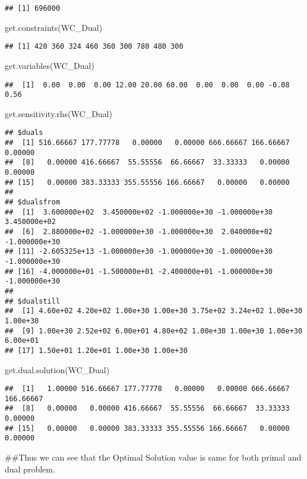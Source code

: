 \documentclass[
]{article}
\newenvironment{Shaded}{\begin{snugshade}}{\end{snugshade}}
\newcommand{\FunctionTok}[1]{\textcolor[rgb]{0.00,0.00,0.00}{#1}}
\newcommand{\NormalTok}[1]{#1}
\begin{document}
\begin{verbatim}
## [1] 696000
\end{verbatim}

\begin{Shaded}
\begin{Highlighting}[]
\FunctionTok{get.constraints}\NormalTok{(WC\_Dual)}
\end{Highlighting}
\end{Shaded}

\begin{verbatim}
## [1] 420 360 324 460 360 300 780 480 300
\end{verbatim}

\begin{Shaded}
\begin{Highlighting}[]
\FunctionTok{get.variables}\NormalTok{(WC\_Dual)}
\end{Highlighting}
\end{Shaded}

\begin{verbatim}
##  [1]  0.00  0.00  0.00 12.00 20.00 60.00  0.00  0.00  0.00 -0.08  0.56
\end{verbatim}

\begin{Shaded}
\begin{Highlighting}[]
\FunctionTok{get.sensitivity.rhs}\NormalTok{(WC\_Dual)}
\end{Highlighting}
\end{Shaded}

\begin{verbatim}
## $duals
##  [1] 516.66667 177.77778   0.00000   0.00000 666.66667 166.66667   0.00000
##  [8]   0.00000 416.66667  55.55556  66.66667  33.33333   0.00000   0.00000
## [15]   0.00000 383.33333 355.55556 166.66667   0.00000   0.00000
## 
## $dualsfrom
##  [1]  3.600000e+02  3.450000e+02 -1.000000e+30 -1.000000e+30  3.450000e+02
##  [6]  2.880000e+02 -1.000000e+30 -1.000000e+30  2.040000e+02 -1.000000e+30
## [11] -2.605325e+13 -1.000000e+30 -1.000000e+30 -1.000000e+30 -1.000000e+30
## [16] -4.000000e+01 -1.500000e+01 -2.400000e+01 -1.000000e+30 -1.000000e+30
## 
## $dualstill
##  [1] 4.60e+02 4.20e+02 1.00e+30 1.00e+30 3.75e+02 3.24e+02 1.00e+30 1.00e+30
##  [9] 1.00e+30 2.52e+02 6.00e+01 4.80e+02 1.00e+30 1.00e+30 1.00e+30 6.00e+01
## [17] 1.50e+01 1.20e+01 1.00e+30 1.00e+30
\end{verbatim}

\begin{Shaded}
\begin{Highlighting}[]
\FunctionTok{get.dual.solution}\NormalTok{(WC\_Dual)}
\end{Highlighting}
\end{Shaded}

\begin{verbatim}
##  [1]   1.00000 516.66667 177.77778   0.00000   0.00000 666.66667 166.66667
##  [8]   0.00000   0.00000 416.66667  55.55556  66.66667  33.33333   0.00000
## [15]   0.00000   0.00000 383.33333 355.55556 166.66667   0.00000   0.00000
\end{verbatim}

\#\#Thus we can see that the Optimal Solution value is same for both
primal and dual problem.
\end{document}
